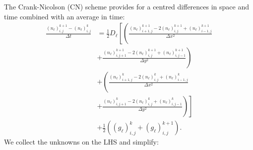 The Crank-Nicolson (CN) scheme provides for a centred differences
in space and time combined with an average in time:
\begin{align*}
\frac{\left(n_{\ell}\right)_{i,j}^{k+1}-\left(n_{\ell}\right)_{i,j}^{k}}{\Delta t} & =\frac{1}{2}D_{\ell}\left[\left(\frac{\left(n_{\ell}\right)_{i+1,j}^{k+1}-2\left(n_{\ell}\right)_{i,j}^{k+1}+\left(n_{\ell}\right)_{i-1,j}^{k+1}}{\Delta x^{2}}\right.\right.\\
 & +\left.\frac{\left(n_{\ell}\right)_{i,j+1}^{k+1}-2\left(n_{\ell}\right)_{i,j}^{k+1}+\left(n_{\ell}\right)_{i,j-1}^{k+1}}{\Delta y^{2}}\right)\\
 & +\left(\frac{\left(n_{\ell}\right)_{i+1,j}^{k}-2\left(n_{\ell}\right)_{i,j}^{k}+\left(n_{\ell}\right)_{i-1,j}^{k}}{\Delta x^{2}}\right.\\
 & +\left.\left.\frac{\left(n_{\ell}\right)_{i,j+1}^{k}-2\left(n_{\ell}\right)_{i,j}^{k}+\left(n_{\ell}\right)_{i,j-1}^{k}}{\Delta y^{2}}\right)\right]\\
 & +\frac{1}{2}\left(\left(g_{\ell}\right)_{i,j}^{k}+\left(g_{\ell}\right)_{i,j}^{k+1}\right).
\end{align*}
We collect the unknowns on the LHS and simplify:

